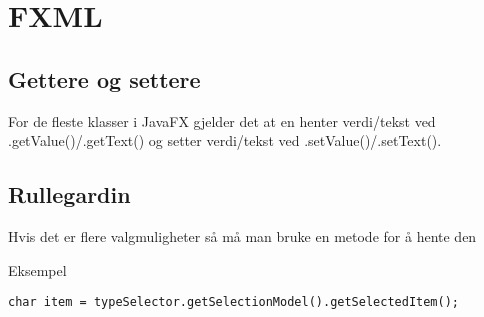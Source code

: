 \documentclass{article}
\begin{document}
\section{FXML}
\subsection{Gettere og settere}
For de fleste klasser i JavaFX gjelder det at en henter verdi/tekst ved .getValue()/.getText() og setter verdi/tekst ved .setValue()/.setText().

\subsection{Rullegardin}
Hvis det er flere valgmuligheter så må man bruke en metode for å hente den

Eksempel
\begin{verbatim}
char item = typeSelector.getSelectionModel().getSelectedItem();
\end{verbatim}
\end{document}
